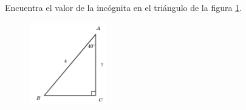 Encuentra el valor de la incógnita en el triángulo de la figura \ref{fig:lados_functrig_13}.
\begin{figure}[H]
    \begin{center}
        \includegraphics[width=0.3\textwidth]{../images/lados_functrig_13.png}
    \end{center}
    \caption{}
    \label{fig:lados_functrig_13}
\end{figure}